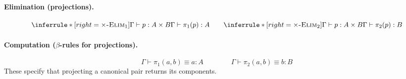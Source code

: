 \documentclass{article}
\newcommand{\Type}{\ensuremath{\mathsf{Type}}}
\newcommand{\defeq}{\vcentcolon\equiv}
\newcommand{\Nat}{\mathsf{Nat}}
\newcommand{\Bool}{\mathsf{Bool}}
\newcommand{\String}{\mathsf{String}}
\newcommand{\judg}[3]{#1 \vdash #2 : #3}   %
\newcommand{\jdeq}{\equiv}                 %
\newcommand{\teq}[4]{#1 \vdash #2 \jdeq #3 : #4} %
\newcommand{\rulename}[1]{\textsc{#1}}
\begin{document}
\paragraph{Elimination (projections).}
\[
\inferrule*[right=\rulename{\(\times\)-Elim\(_1\)}]{
  \judg{\Gamma}{p}{A \times B}
}{
  \judg{\Gamma}{\pi_1(p)}{A}
}
\qquad
\inferrule*[right=\rulename{\(\times\)-Elim\(_2\)}]{
  \judg{\Gamma}{p}{A \times B}
}{
  \judg{\Gamma}{\pi_2(p)}{B}
}
\]

\paragraph{Computation (\(\beta\)-rules for projections).}
\[
\teq{\Gamma}{\pi_1(a,b)}{a}{A}
\qquad\qquad
\teq{\Gamma}{\pi_2(a,b)}{b}{B}
\]
These specify that projecting a canonical pair returns its components.



\end{document}

